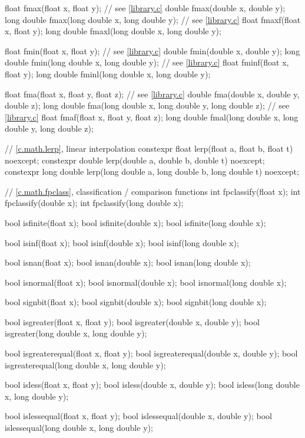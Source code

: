\begin{codeblock}
{  float fmax(float x, float y);         // see \ref{library.c}
  double fmax(double x, double y);
  long double fmax(long double x, long double y);   // see \ref{library.c}
  float fmaxf(float x, float y);
  long double fmaxl(long double x, long double y);

  float fmin(float x, float y);         // see \ref{library.c}
  double fmin(double x, double y);
  long double fmin(long double x, long double y);   // see \ref{library.c}
  float fminf(float x, float y);
  long double fminl(long double x, long double y);

  float fma(float x, float y, float z); // see \ref{library.c}
  double fma(double x, double y, double z);
  long double fma(long double x, long double y, long double z); // see \ref{library.c}
  float fmaf(float x, float y, float z);
  long double fmal(long double x, long double y, long double z);

  // \ref{c.math.lerp}, linear interpolation
  constexpr float lerp(float a, float b, float t) noexcept;
  constexpr double lerp(double a, double b, double t) noexcept;
  constexpr long double lerp(long double a, long double b, long double t) noexcept;

  // \ref{c.math.fpclass}, classification / comparison functions
  int fpclassify(float x);
  int fpclassify(double x);
  int fpclassify(long double x);

  bool isfinite(float x);
  bool isfinite(double x);
  bool isfinite(long double x);

  bool isinf(float x);
  bool isinf(double x);
  bool isinf(long double x);

  bool isnan(float x);
  bool isnan(double x);
  bool isnan(long double x);

  bool isnormal(float x);
  bool isnormal(double x);
  bool isnormal(long double x);

  bool signbit(float x);
  bool signbit(double x);
  bool signbit(long double x);

  bool isgreater(float x, float y);
  bool isgreater(double x, double y);
  bool isgreater(long double x, long double y);

  bool isgreaterequal(float x, float y);
  bool isgreaterequal(double x, double y);
  bool isgreaterequal(long double x, long double y);

  bool isless(float x, float y);
  bool isless(double x, double y);
  bool isless(long double x, long double y);

  bool islessequal(float x, float y);
  bool islessequal(double x, double y);
  bool islessequal(long double x, long double y);

}
\end{codeblock}
